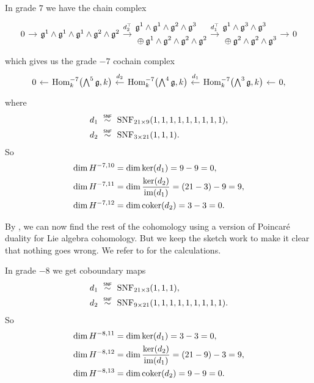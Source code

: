 In grade $7$ we have the chain complex
\[
  \begin{tikzcd}[ampersand replacement=\&, column sep=1em]
    0 \ar[r] \& \lie{g}^{1} \wedge \lie{g}^{1} \wedge \lie{g}^{1} \wedge \lie{g}^{2} \wedge \lie{g}^{2} \ar[r,"d_{2}^{\top}" {yshift=2pt}] \& \begin{aligned} &\lie{g}^{1} \wedge \lie{g}^{1} \wedge \lie{g}^{2} \wedge \lie{g}^{3} \\ &\oplus \lie{g}^{1} \wedge \lie{g}^{2} \wedge \lie{g}^{2} \wedge \lie{g}^{2} \end{aligned} \ar[r,"d_{1}^{\top}" {yshift=2pt}] \& \begin{aligned} &\lie{g}^{1} \wedge \lie{g}^{3} \wedge \lie{g}^{3} \\ &\oplus \lie{g}^{2} \wedge \lie{g}^{2} \wedge \lie{g}^{3} \end{aligned}\ar[r] \& 0
  \end{tikzcd}
\]
which gives us the grade $-7$ cochain complex
\[
  \begin{tikzcd}[column sep=1em]
    0 & \ar[l] \Hom_{k}^{-7}\bigl( \bigwedge^{5}\lie{g}, k \bigr) & \ar[l,"d_{2}"' {yshift=2pt}] \Hom_{k}^{-7}\bigl( \bigwedge^{4}\lie{g}, k \bigr) & \ar[l,"d_{1}"' {yshift=2pt}] \Hom_{k}^{-7}\bigl( \bigwedge^{3}\lie{g}, k \bigr) & \ar[l] 0,
  \end{tikzcd}
\]
where
\begin{align*}
  d_{1} &\snfsim \SNF_{21\times9}(1,1,1,1,1,1,1,1,1), \\
  d_{2} &\snfsim \SNF_{3\times21}(1,1,1).
\end{align*}
So
\begin{align*}
  \dim H^{-7,10} &= \dim \operatorname{ker}(d_{1}) = 9-9 = 0, \\
  \dim H^{-7,11} &= \dim \dfrac{\operatorname{ker}(d_{2})}{\operatorname{im}(d_{1})} = (21-3) - 9 = 9, \\
  \dim H^{-7,12} &= \dim \operatorname{coker}(d_{2}) = 3 - 3 = 0.
\end{align*}

By \cite[§3.6 and §3.7]{Fuks}, we can now find the rest of the cohomology using a version of Poincaré duality for Lie algebra cohomology. But we keep the sketch work to make it clear that nothing goes wrong. We refer to \cite{code} for the calculations.

In grade $-8$ we get coboundary maps
\begin{align*}
  d_{1} &\snfsim \SNF_{21\times3}(1,1,1), \\
  d_{2} &\snfsim \SNF_{9\times21}(1,1,1,1,1,1,1,1,1).
\end{align*}
So
\begin{align*}
  \dim H^{-8,11} &= \dim \operatorname{ker}(d_{1}) = 3-3 = 0, \\
  \dim H^{-8,12} &= \dim \dfrac{\operatorname{ker}(d_{2})}{\operatorname{im}(d_{1})} = (21-9) - 3 = 9, \\
  \dim H^{-8,13} &= \dim \operatorname{coker}(d_{2}) = 9 - 9 = 0.
\end{align*}


